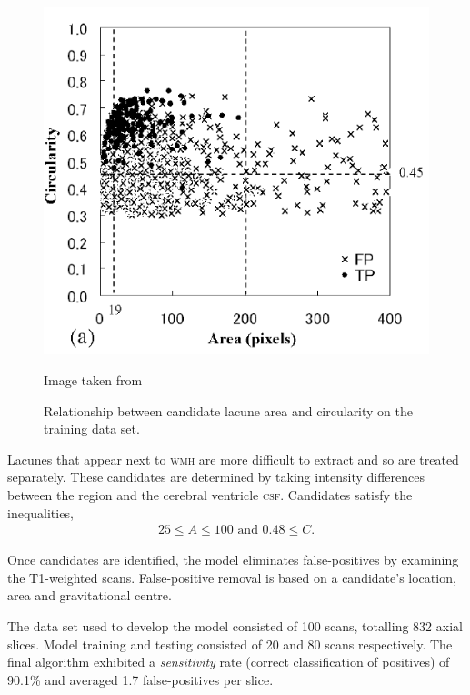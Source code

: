 \begin{figure}[ht]
\centering
\includegraphics[scale=0.7]{Images/5_yokoyama_reg.png}
\caption{Relationship between candidate lacune area and circularity on the training data set.}
\small Image taken from \cite{Yokoyama2007}
\label{litrev-area-circ}
\end{figure}

Lacunes that appear next to \textsc{wmh} are more difficult to extract and so are treated separately. These candidates are determined by taking intensity differences between the region and the cerebral ventricle \textsc{csf}. Candidates satisfy the inequalities,
\begin{align*}
	25 \le A \le 100\text{ and } 0.48 \le C.
\end{align*}

Once candidates are identified, the model eliminates false-positives by examining the T1-weighted scans. False-positive removal is based on a candidate's location, area and gravitational centre.

The data set used to develop the model consisted of 100 scans, totalling 832 axial slices. Model training and testing consisted of 20 and 80 scans respectively. The final algorithm exhibited a \textit{sensitivity} rate (correct classification of positives) of 90.1\% and averaged 1.7 false-positives per slice.


